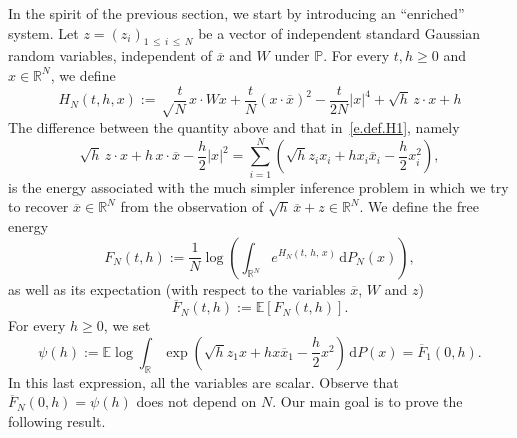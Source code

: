 \documentclass[10pt]{amsart}
\theoremstyle{definition}\newtheorem{defi}[theo]{Definition}\newtheorem{rema}[theo]{Remark}\newtheorem{exam}[theo]{Example}\newtheorem{exem}[theo]{Example}\newtheorem{nota}[theo]{Notation}
\newcommand{\R}{\mathbb{R}}
\newcommand{\E}{\mathbb{E}}
\renewcommand{\P}{\mathbb{P}}
\renewcommand{\d}{\mathrm{d}}
\newcommand{\1}{\mathds{1}}
\renewcommand{\le}{\leqslant}
\renewcommand{\ge}{\geqslant}
\renewcommand{\bar}{\overline}
\begin{document}
In the spirit of the previous section, we start by introducing an ``enriched'' system. Let $z = (z_i)_{1\,\le\, i\,\le\,N}$ be a vector of independent standard Gaussian random variables, independent of $\bar x$ and $W$ under $\P$. For every $t, {h} \ge 0$ and $x \in \R^N$, we define
\[
H_N(t,{h},x) :=
\sqrt \frac t N\, x \cdot W x + \frac t N (x \cdot \bar x)^2 - \frac t {2N} |x|^4 + \sqrt{h} \, z \cdot x + {h} \]
The difference between the quantity above and that in~\eqref{e.def.H1}, namely
\[
\sqrt{h} \, z \cdot x + {h} \, x \cdot \bar x - \frac {h} 2 |x|^2 = \sum_{i = 1}^N \left(\sqrt{{h}} z_i x_i + {h} x_i \bar x_i - \frac {h} 2 x_i^2\right),
\]
is the energy associated with the much simpler inference problem in which we try to recover $\bar x \in \R^N$ from the observation of $\sqrt {h} \, \bar x + z \in \R^N$. We define the free energy
\begin{equation}\label{e.enriched.free.energy}
F_N(t,{h}) := \frac 1 N \log\left(\int_{\R^N} e^{ H_N(t,\,{h},\,x)} \, \d P_N(x) \right),
\end{equation}
as well as its expectation (with respect to the variables $\bar x$, $W$ and $z$)
\begin{equation}\label{e.expectation.free.energy}
\bar F_N(t,{h}) := \E \left[F_N(t,h) \right].
\end{equation}
For every $h \ge 0$, we set
\begin{equation}\label{e.def.psi}
\psi({h}) := \E \log \int_\R \exp\left(\sqrt{h} z_1 x +h x \bar x_1 - \frac h 2 x^2 \right) \, \d P(x) = \bar F_1(0,h).
\end{equation}
In this last expression, all the variables are scalar. Observe that $\bar F_N(0,h) = \psi(h)$ does not depend on $N$. Our main goal is to prove the following result.
\end{document}
